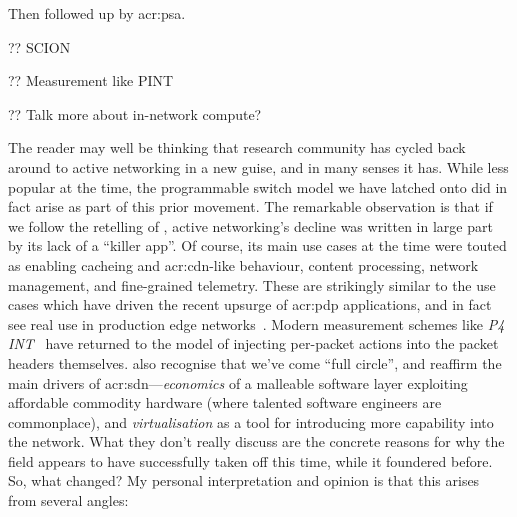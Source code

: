 Then followed up by  \gls{acr:psa}\parencite{p4-psa}.

?? SCION~\parencite{DBLP:conf/conext/RuiterS21}

?? Measurement like PINT~\parencite{DBLP:conf/sigcomm/BasatRLAYM20}

?? Talk more about in-network compute?

The reader may well be thinking that research community has cycled back around to active networking in a new guise, and in many senses it has.
While less popular at the time, the programmable switch model we have latched onto did in fact arise as part of this prior movement.
The remarkable observation is that if we follow the retelling of \Textcite{DBLP:journals/ccr/FeamsterRZ14}, active networking's decline was written in large part by its lack of a ``killer app''.
Of course, its main use cases at the time were touted as enabling cacheing and \gls{acr:cdn}-like behaviour, content processing, network management, and fine-grained telemetry.
These are strikingly similar to the use cases which have driven the recent upsurge of \gls{acr:pdp} applications, and in fact see real use in production edge networks~\parencite{DBLP:conf/sigcomm/TianGLZCZDYMTLW21}.
Modern measurement schemes like \emph{P4 INT}~\parencite{p4-int} have returned to the model of injecting per-packet actions into the packet headers themselves.
\Textcite{DBLP:journals/ccr/WetherallT19} also recognise that we've come ``full circle'', and reaffirm the main drivers of \gls{acr:sdn}---\emph{economics} of a malleable software layer exploiting affordable commodity hardware (where talented software engineers are commonplace), and \emph{virtualisation} as a tool for introducing more capability into the network.
What they don't really discuss are the concrete reasons for why the field appears to have successfully taken off this time, while it foundered before.
So, what changed?
My personal interpretation and opinion is that this arises from several angles: 
